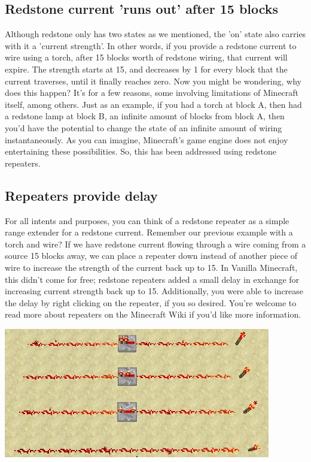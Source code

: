 \documentclass{article}
\begin{document}
    \subsection{Redstone current 'runs out' after 15 blocks }
    Although redstone only has two states as we mentioned, the 'on' state also carries with it a 'current strength'. In other words, if you provide a redstone current to wire using a torch, after 15 blocks worth of redstone wiring, that current will expire. The strength starts at 15, and decreases by 1 for every block that the current traverses, until it finally reaches zero.
    \newline\newline
    Now you might be wondering, why does this happen? It's for a few reasons, some involving limitations of Minecraft itself, among others. Just as an example, if you had a torch at block A, then had a redstone lamp at block B, an infinite amount of blocks from block A, then you'd have the potential to change the state of an infinite amount of wiring instantaneously. As you can imagine, Minecraft's game engine does not enjoy entertaining these possibilities. So, this has been addressed using redstone repeaters.
    
    \subsection{Repeaters provide delay}
    For all intents and purposes, you can think of a redstone repeater as a simple range extender for a redstone current. Remember our previous example with a torch and wire? If we have redstone current flowing through a wire coming from a source 15 blocks away, we can place a repeater down instead of another piece of wire to increase the strength of the current back up to 15. In Vanilla Minecraft, this didn't come for free; redstone repeaters added a small delay in exchange for increasing current strength back up to 15. Additionally, you were able to increase the delay by right clicking on the repeater, if you so desired. You're welcome to read more about repeaters on the Minecraft Wiki if you'd like more information.\newline
    
    \includegraphics[width=\textwidth]{misc1_3.JPG}\newline
    
\end{document}
